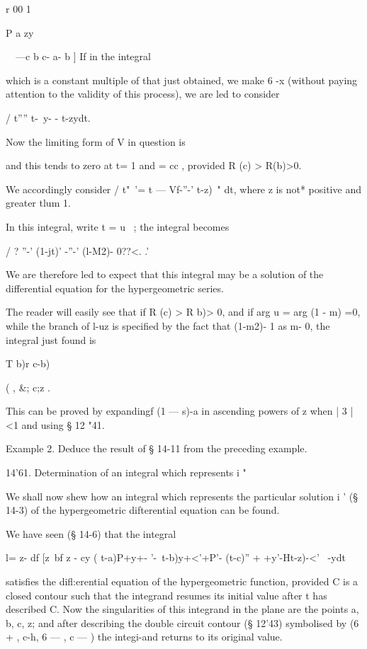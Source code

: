 r 00 1 \

P a zy

\ \ —c b c- a- b ] If in the integral

which is a constant multiple of that just obtained, we make 6 -x
(without paying attention to the validity of this process), we are led
to consider

/ t'''' t-\ y- - t-zydt.

Now the limiting form of V in question is

and this tends to zero at t= 1 and = cc , provided R (c) > R(b)>0.

We accordingly consider / t"~'= t — Vf-''-' t-z)~" dt, where z is not*
positive and greater tlum 1.

In this integral, write t = u~ ; the integral becomes

/ ? ''-' (1-jt)' -''-' (l-M2)- 0??<. .'

We are therefore led to expect that this integral may be a solution of
the differential equation for the hypergeometric series.

The reader will easily see that if R (c) > R b)> 0, and if arg u = arg
(1 - m) =0, while the branch of l-uz is specified by the fact that
(1-m2)- 1 as m- 0, the integral just found is

T b)r c-b)

  ( , \&; c;z .

This can be proved by expandingf (1 — s)-a in ascending powers of z
when | 3 | <1 and using § 12 "41.

Example 2. Deduce the result of § 14-11 from the preceding example.

14'61. Determination of an integral which represents i "\

We shall now shew how an integral which represents the particular
solution i ' (§ 14-3) of the hypergeometric difterential equation can
be found.

We have seen (§ 14-6) that the integral

l= z- df [z~bf z - cy ( t-a)P+y+- '-\ t-b)y+<'+P'- (t-c)'' +
+y'-Ht-z)-<'~ -ydt

satisfies the difl:erential equation of the hypergeometric function,
provided C is a closed contour such that the integrand resumes its
initial value after t has described C. Now the singularities of this
integrand in the plane are the points a, b, c, z; and after describing
the double circuit contour (§ 12'43) symbolised by (6 + , c-h, 6 — , c
— ) the integi-and returns to its original value.

